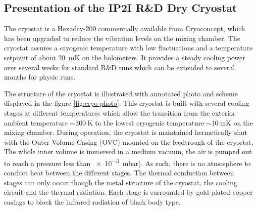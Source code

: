\subsection{Presentation of the IP2I R\&D Dry Cryostat}

The cryostat is a Hexadry-200 commercially available from Cryoconcept, which has been upgraded to reduce the vibration levels on the mixing chamber.
The cryostat assures a cryogenic temperature with low fluctuations and a temperature setpoint of about \SI{20}{\milli\kelvin} on the bolometers. It provides a steady cooling power over several weeks for standard R\&D runs which can be extended to several months for physic runs.

The structure of the cryostat is illustrated with annotated photo and scheme displayed in the figure \ref{fig:cryo-photo}. This cryostat is built with several cooling stages at different temperatures which allow the transition from the exterior ambient temperature $\sim \SI{300}{\kelvin}$ to the lowest cryogenic temperature $\sim \SI{10}{\milli\kelvin}$ on the mixing chamber. During operation, the cryostat is maintained hermetically shut with the Outer Volume Casing (OVC) mounted on the feedtrough of the cryostat. The whole inner volume is immersed in a medium vacuum, the air is pumped out to reach a pressure less than \SI{e-3}{\milli\bar}). As such, there is no atmosphere to conduct heat between the different stages. The thermal conduction between stages can only occur though the metal structure of the cryostat, the cooling circuit and the thermal radiation. Each stage is surrounded by gold-plated copper casings to block the infrared radiation of black body type.

